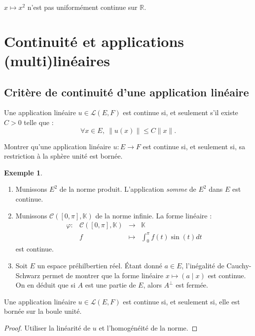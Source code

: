 \documentclass[french]{article}
\newcommand{\R}{\mathbb{R}}
\newcommand{\K}{\mathbb{K}}
\theoremstyle{plain}
\theoremstyle{definition}
\newtheorem*{ex}{Exemple}
\theoremstyle{remark}
\begin{document}
\begin{exo}
	$x\mapsto x^2$ n'est pas uniformément continue sur $\R$. %
\end{exo}

\section{Continuité et applications (multi)linéaires}

\subsection{Critère de continuité d'une application linéaire}

\begin{prop}%
	Une application linéaire $u\in\mathcal{L}(E,F)$ est continue si, et seulement s'il existe $C>0$ telle que : $$\forall x\in E,\ \lVert u(x)\rVert\leqslant C\lVert x\rVert.$$ 
\end{prop}

\begin{exo}
	Montrer qu'une application linéaire $u:E\to F$ est continue si, et seulement si, sa restriction à la sphère unité est bornée.
\end{exo}

\begin{ex}
	\begin{enumerate}
		\item Munissons $E^2$ de la norme produit. L'application \textit{somme} de $E^2$ dans $E$ est continue.
		\item Munissons $\mathcal{C}([0,\pi],\K)$ de la norme infinie. La forme linéaire :
		$$\begin{array}{lrcl}
			\varphi:&\mathcal{C}([0,\pi],\K)&\longrightarrow&\K\\
			&f&\longmapsto&\displaystyle\int_{0}^{\pi}f(t)\sin(t)dt
		\end{array}$$ est continue.
		\item Soit $E$ un espace préhilbertien réel. Étant donné $a\in E$, l'inégalité de Cauchy-Schwarz permet de montrer que la forme linéaire $x\mapsto (a\mid x)$ est continue. On en déduit que si $A$ est une partie de $E$, alors $A^\bot$ est fermée.
	\end{enumerate}
\end{ex}

\begin{cor}%
	Une application linéaire $u\in\mathcal{L}(E,F)$ est continue si, et seulement si, elle est bornée sur la boule unité.
\end{cor}
\begin{proof}
	Utiliser la linéarité de $u$ et l'homogénéité de la norme.
\end{proof}
\end{document}

